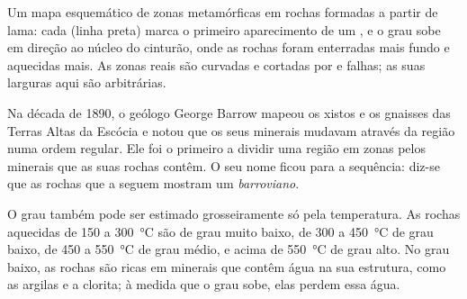 \begin{omfigure}

{\small Um mapa esquemático de zonas metamórficas em rochas formadas a
partir de lama: cada  (linha preta) marca o primeiro aparecimento de
um , e o grau sobe em direção ao núcleo do cinturão, onde as
rochas foram enterradas mais fundo e aquecidas mais. As zonas reais são
curvadas e cortadas por  e falhas; as suas larguras aqui são
arbitrárias.}
\end{omfigure}

\begin{history}
Na década de 1890, o geólogo George Barrow mapeou os xistos e os gnaisses
das Terras Altas da Escócia e notou que os seus minerais mudavam através da
região numa ordem regular. Ele foi o primeiro a dividir uma região em zonas
pelos minerais que as suas rochas contêm. O seu nome ficou para a
sequência: diz-se que as rochas que a seguem mostram um 
\emph{barroviano}.
\end{history}

O grau também pode ser estimado grosseiramente só pela temperatura. As
rochas aquecidas de 150 a \qty{300}{\celsius} são de grau muito baixo, de
300 a \qty{450}{\celsius} de grau baixo, de 450 a \qty{550}{\celsius} de
grau médio, e acima de \qty{550}{\celsius} de grau alto. No grau baixo, as
rochas são ricas em minerais que contêm água na sua estrutura, como as
argilas e a clorita; à medida que o grau sobe, elas perdem essa água.

